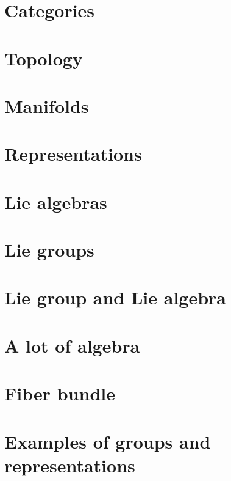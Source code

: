 \documentclass[a4paper,twoside,11pt]{book}
\begin{document}
\chapter{Categories}        \label{chap_category}


\chapter{Topology}              \label{chap_topology}



\chapter{Manifolds} \label{Chapitre_FB}



\chapter{Representations}


\chapter{Lie algebras}







\chapter{Lie groups}


\chapter{Lie group and Lie algebra}


\chapter{A lot of algebra}




\chapter{Fiber bundle}



\chapter{Examples of groups and representations}        \label{ChapThoComsGroupes}


\end{document}
